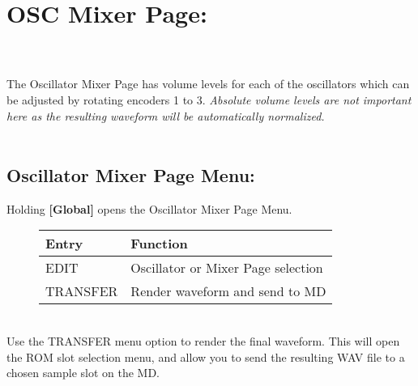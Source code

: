 \section{OSC Mixer Page:}
\\\\
The Oscillator Mixer Page has volume levels for each of the oscillators which can be adjusted by rotating encoders 1 to 3. \textit{Absolute volume levels are not important here as the resulting waveform will be automatically normalized.}\\
\\
\subsection{Oscillator Mixer Page Menu:}
Holding \textbf{[Global]} opens the Oscillator Mixer Page Menu.
\begin{figure}[hb]
    \begin{tabular}{|l|l|}
    \hline
    \rowcolor[HTML]{C0C0C0}
    Entry     & Function \\ \hline
    EDIT      & Oscillator or Mixer Page selection \\ \hline
    TRANSFER  & Render waveform and send to MD\\ \hline
    \end{tabular}
\end{figure}
\\
Use the TRANSFER menu option to render the final waveform. This will open the ROM slot selection menu, and allow you to send the resulting WAV file to a chosen sample slot on the MD.